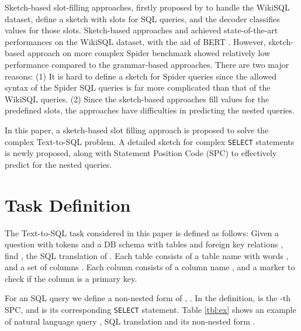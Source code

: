 \documentclass[11pt,a4paper]{article}
\begin{document}
Sketch-based slot-filling approaches, firstly proposed by \citet{sqlnet} to handle the WikiSQL dataset, define a sketch with slots for SQL queries, and the decoder classifies values for those slots. Sketch-based approaches \citet{sqlova} and \citet{xsql} achieved state-of-the-art performances on the WikiSQL dataset, with the aid of BERT \citep{Devlin:19}. However, sketch-based approach on more complex Spider benchmark \citep{rcsql} showed relatively low performance compared to the grammar-based approaches. There are two major reasons: (1) It is hard to define a sketch for Spider queries since the allowed syntax of the Spider SQL queries is far more complicated than that of the WikiSQL queries. (2) Since the sketch-based approaches fill values for the predefined slots, the approaches have difficulties in predicting the nested queries.

In this paper, a sketch-based slot filling approach is proposed to solve the complex Text-to-SQL problem. A detailed sketch for complex \texttt{SELECT} statements is newly proposed, along with Statement Position Code (SPC) to effectively predict for the nested queries.

\section{Task Definition}
\label{sec:task}
The Text-to-SQL task considered in this paper is defined as follows: Given a question with  tokens  and a DB schema with  tables and  foreign key relations , find , the SQL translation of . Each table  consists of a table name with  words , and a set of columns . Each column  consists of a column name , and a marker to check if the column is a primary key.  

For an SQL query  we define a non-nested form of , . In the definition,  is the -th SPC, and  is its corresponding \texttt{SELECT} statement. Table \ref{tbl:ex} shows an example of natural language query , SQL translation  and its non-nested form .
\end{document}
